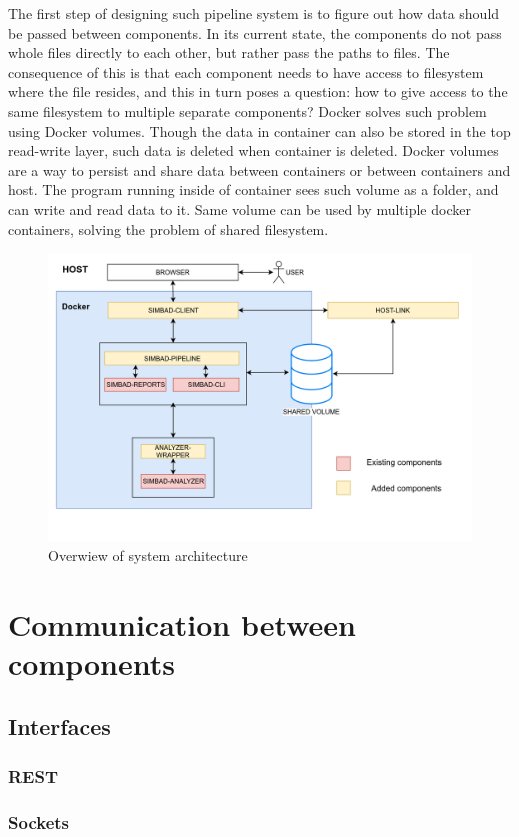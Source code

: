 The first step of designing such pipeline system is to figure out how data should be passed between components. In its current state, the components do not pass whole files directly to each other, but rather pass the paths to files. The consequence of this is that each component needs to have access to filesystem where the file resides, and this in turn poses a question: how to give access to the same filesystem to multiple separate components? Docker solves such problem using Docker volumes.  Though the data in container can also be stored in the top read-write layer, such data is deleted when container is deleted. Docker volumes are a way to persist and share data between containers or between containers and host. The program running inside of container sees such volume as a folder, and can write and read data to it. Same volume can be used by multiple docker containers, solving the problem of shared filesystem.
\begin{figure}[h!]
	\centering
		\includegraphics[width=0.9\linewidth]{diagrams/architecture-diagram.png}
	\caption{Overwiew of system architecture}
	\label{fig:architecture}
\end{figure}
\section{Communication between components}
\subsection{Interfaces}
\subsubsection{REST}
\subsubsection{Sockets}
